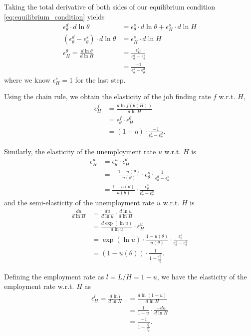 \documentclass[12pt]{article}
\begin{document}
Taking the total derivative of both sides of our equilibrium condition \ref{eq:equilibrium_condition} yields
\begin{align*}
    \epsilon^d_\theta \cdot d \ln \theta &= \epsilon^s_\theta \cdot d \ln \theta + \epsilon^s_H \cdot d \ln H \\
    (\epsilon^d_\theta - \epsilon^s_\theta) \cdot d \ln \theta &= \epsilon^s_H \cdot d \ln H \\
    \epsilon^\theta_H = \frac{d \ln \theta}{d \ln H} &= \frac{\epsilon^s_H}{\epsilon^d_\theta - \epsilon^s_\theta} \\
    &= \frac{-1}{\epsilon^s_\theta - \epsilon^d_\theta}
\end{align*}
where we know $\epsilon^s_H = 1$ for the last step.

Using the chain rule, we obtain the elasticity of the job finding rate $f$ w.r.t. $H$,
\begin{align*}
    \epsilon^f_H &= \frac{d \ln f(\theta(H))}{d \ln H} \\
    &= \epsilon^f_\theta \cdot \epsilon^\theta_H \\
    &= (1-\eta) \cdot \frac{-1}{\epsilon^s_\theta - \epsilon^d_\theta}.
\end{align*}

Similarly, the elasticity of the unemployment rate $u$ w.r.t. $H$ is
\begin{align*}
    \epsilon^u_H &= \epsilon^u_\theta \cdot \epsilon^\theta_H \\
    &= -\frac{1 - u(\theta)}{u(\theta)} \cdot \epsilon^s_\theta \cdot \frac{1}{\epsilon^d_\theta - \epsilon^s_\theta} \\
    &= \frac{1 - u(\theta)}{u(\theta)} \cdot \frac{\epsilon^s_\theta}{\epsilon^s_\theta - \epsilon^d_\theta}
\end{align*}
and the semi-elasticity of the unemployment rate $u$ w.r.t. $H$ is
\begin{align*}
    \frac{d u}{d \ln H} &= \frac{d u}{d \ln u} \cdot \frac{d \ln u}{d \ln H} \\
    &= \frac{d \exp(\ln u)}{d \ln u} \cdot \epsilon^u_H \\
    &= \exp(\ln u) \cdot \frac{1 - u(\theta)}{u(\theta)} \cdot \frac{\epsilon^s_\theta}{\epsilon^s_\theta - \epsilon^d_\theta} \\
    &= (1 - u(\theta)) \cdot \frac{1}{1 - \frac{\epsilon^d_\theta}{\epsilon^s_\theta}}.
\end{align*}

Defining the employment rate as $l = L/H = 1 - u$, we have the elasticity of the employment rate w.r.t. $H$ as
\begin{align*}
    \epsilon^l_H = \frac{d \ln l}{d \ln H} &= \frac{d \ln (1-u)}{d \ln H} \\
    &= \frac{1}{1 - u} \cdot \frac{- d u}{d \ln H} \\
    &= \frac{- 1}{1 - \frac{\epsilon^d_\theta}{\epsilon^s_\theta}}.
\end{align*}
\end{document}
